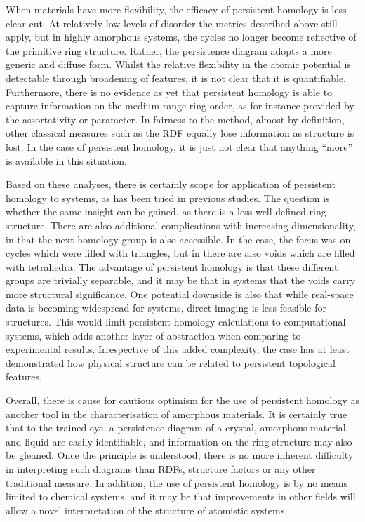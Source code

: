 When materials have more flexibility, the efficacy of persistent homology is less clear cut.
At relatively low levels of disorder the metrics described above still apply, but in highly amorphous systems, the cycles no longer become reflective of the primitive ring structure.
Rather, the persistence diagram adopts a more generic and diffuse form.
Whilst the relative flexibility in the atomic potential is detectable through broadening of features, it is not clear that it is quantifiable.
Furthermore, there is no evidence as yet that persistent homology is able to capture information on the medium range ring order, as for instance provided by the assortativity or \aw{} parameter.
In fairness to the method, almost by definition, other classical measures such as the RDF equally lose information as structure is lost.
In the case of persistent homology, it is just not clear that anything ``more'' is available in this situation.

Based on these \td{} analyses, there is certainly scope for application of persistent homology to \thd{} systems, as has been tried in previous studies.
The question is whether the same insight can be gained, as there is a less well defined ring structure.
There are also additional complications with increasing dimensionality, in that the next homology group is also accessible.
In the \td{} case, the focus was on cycles which were filled with triangles, but in \thd{} there are also voids which are filled with tetrahedra.
The advantage of persistent homology is that these different groups are trivially separable, and it may be that in \thd{} systems that the voids carry more structural significance.
One potential downside is also that while real\--space data is becoming widespread for \td{} systems, direct imaging is less feasible for \thd{} structures.
This would limit persistent homology calculations to computational systems, which adds another layer of abstraction when comparing to experimental results.
Irrespective of this added complexity, the \td{} case has at least demonstrated how physical structure can be related to persistent topological features.

Overall, there is cause for cautious optimism for the use of persistent homology as another tool in the characterisation of amorphous materials.
It is certainly true that to the trained eye, a persistence diagram of a crystal, amorphous material and liquid are easily identifiable, and information on the ring structure may also be gleaned. 
Once the principle is understood, there is no more inherent difficulty in interpreting such diagrams than RDFs, structure factors or any other traditional measure.
In addition, the use of persistent homology is by no means limited to chemical systems, and it may be that improvements in other fields will allow a novel interpretation of the structure of atomistic systems.
   
